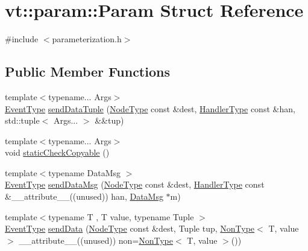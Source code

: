 \hypertarget{structvt_1_1param_1_1_param}{}\section{vt\+:\+:param\+:\+:Param Struct Reference}
\label{structvt_1_1param_1_1_param}


{\ttfamily \#include $<$parameterization.\+h$>$}

\subsection*{Public Member Functions}
\begin{DoxyCompactItemize}
\item 
{\footnotesize template$<$typename... Args$>$ }\\\hyperlink{namespacevt_a009267401def7ae8bf201892222d060f}{Event\+Type} \hyperlink{structvt_1_1param_1_1_param_acaea25a7afac63671b36abff3c4d6e00}{send\+Data\+Tuple} (\hyperlink{namespacevt_a866da9d0efc19c0a1ce79e9e492f47e2}{Node\+Type} const \&dest, \hyperlink{namespacevt_af64846b57dfcaf104da3ef6967917573}{Handler\+Type} const \&han, std\+::tuple$<$ Args... $>$ \&\&tup)
\item 
{\footnotesize template$<$typename... Args$>$ }\\void \hyperlink{structvt_1_1param_1_1_param_a8d670f74eb5f0a1b5ea312e8b174b648}{static\+Check\+Copyable} ()
\item 
{\footnotesize template$<$typename Data\+Msg $>$ }\\\hyperlink{namespacevt_a009267401def7ae8bf201892222d060f}{Event\+Type} \hyperlink{structvt_1_1param_1_1_param_a2615b77a887582b584f2e508d7b7b8e6}{send\+Data\+Msg} (\hyperlink{namespacevt_a866da9d0efc19c0a1ce79e9e492f47e2}{Node\+Type} const \&dest, \hyperlink{namespacevt_af64846b57dfcaf104da3ef6967917573}{Handler\+Type} const \&\+\_\+\+\_\+attribute\+\_\+\+\_\+((unused)) han, \hyperlink{structvt_1_1param_1_1_data_msg}{Data\+Msg} $\ast$m)
\item 
{\footnotesize template$<$typename T , T value, typename Tuple $>$ }\\\hyperlink{namespacevt_a009267401def7ae8bf201892222d060f}{Event\+Type} \hyperlink{structvt_1_1param_1_1_param_aea67124175d1d028b36f4d3e38b4dd48}{send\+Data} (\hyperlink{namespacevt_a866da9d0efc19c0a1ce79e9e492f47e2}{Node\+Type} const \&dest, Tuple tup, \hyperlink{structvt_1_1param_1_1_non_type}{Non\+Type}$<$ T, value $>$ \+\_\+\+\_\+attribute\+\_\+\+\_\+((unused)) non=\hyperlink{structvt_1_1param_1_1_non_type}{Non\+Type}$<$ T, value $>$())

\end{DoxyCompactItemize}
